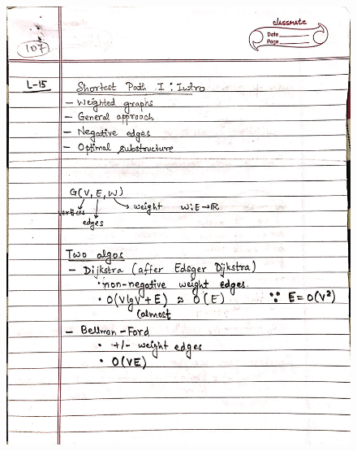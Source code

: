 \newpage
\begin{figure}[H]
    \centering
    \includegraphics[scale=0.25]{"./MIT-6.006/MIT-6006-107"}
\end{figure}
\newpage

